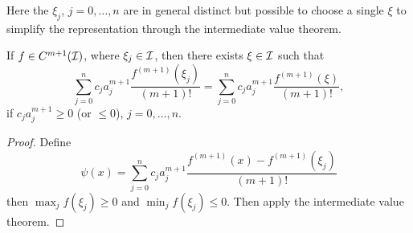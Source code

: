 \begin{remark}
    Here the $\xi_j$, $j=0,\dots,n$ are in general distinct but possible to choose a single $\xi$ to simplify the representation through the intermediate value theorem. 
\end{remark}
\begin{lemma}\label{LEM: FD COEF}
    If $f\in C^{m+1}(\mathcal I)$, where $\xi_j\in\mathcal I$, then there exists $\xi\in \mathcal I$ such that 
    \begin{equation}
        \sum_{j=0}^n c_j  a_j^{m+1}\frac{f^{(m+1)}(\xi_j)}{(m+1)!} =   \sum_{j=0}^n c_j  a_j^{m+1}\frac{f^{(m+1)}(\xi)}{(m+1)!},
    \end{equation}
    if $c_j a_j^{m+1}\ge 0$ (or $\le 0$), $j=0,\dots, n$. 
\end{lemma}
\begin{proof}
    Define $$\psi(x) =  \sum_{j=0}^n c_j  a_j^{m+1}\frac{f^{(m+1)}(x) - f^{(m+1)}(\xi_j)}{(m+1)!}$$
    then $\max_j f(\xi_j)\ge 0$ and $\min_j f(\xi_j) \le 0$. Then apply the intermediate value theorem. 
\end{proof}

